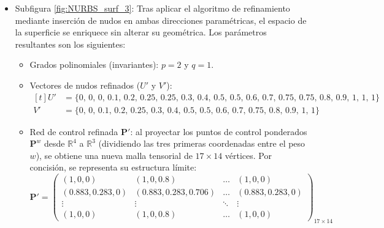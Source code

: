 \documentclass[11pt]{book}
\theoremstyle{plain} %
\theoremstyle{definition} %
\theoremstyle{definition} %
\begin{document}
\begin{itemize}
\begin{itemize}
\begin{equation*}
\begin{pmatrix}
                1 & 1 & 1 & 1 & 1 \\
                \frac{\sqrt{2}}{2} & \frac{\sqrt{2}}{2} & \frac{\sqrt{2}}{2} & \frac{\sqrt{2}}{2} & \frac{\sqrt{2}}{2} \\
                1 & 1 & 1 & 1 & 1
            \end{pmatrix}
        \end{equation*}
    \end{itemize}
    \item Subfigura \ref{fig:NURBS_surf_3}:
    Tras aplicar el algoritmo de refinamiento mediante inserción de nudos en ambas direcciones paramétricas, el espacio de la superficie se enriquece sin alterar su geométrica. Los parámetros resultantes son los siguientes:

    \begin{itemize}
        \item Grados polinomiales (invariantes): $p = 2$ y $q = 1$.
        \item Vectores de nudos refinados ($U'$ y $V'$): \\
        $\begin{aligned}[t]
            U' &= \{0,\, 0,\, 0,\, 0.1,\, 0.2,\, 0.25,\, 0.25,\, 0.3,\, 0.4,\, 0.5,\, 0.5,\, 0.6,\, 0.7,\, 0.75,\, 0.75,\, 0.8,\, 0.9,\, 1,\, 1,\, 1\} \\
            V' &= \{0,\, 0,\, 0.1,\, 0.2,\, 0.25,\, 0.3,\, 0.4,\, 0.5,\, 0.5,\, 0.6,\, 0.7,\, 0.75,\, 0.8,\, 0.9,\, 1,\, 1\}
        \end{aligned}$
        \item Red de control refinada $\mathbf{P}'$: al proyectar los puntos de control ponderados $\mathbf{P}^w$ desde $\mathbb{R}^4$ a $\mathbb{R}^3$ (dividiendo las tres primeras coordenadas entre el peso $w$), se obtiene una nueva malla tensorial de $17 \times 14$ vértices. Por concisión, se representa su estructura límite:
        \begin{equation*}
            \mathbf{P}' = \begin{pmatrix}
                (1, 0, 0) & (1, 0, 0.8) & \dots & (1, 0, 0) \\
                (0.883, 0.283, 0) & (0.883, 0.283, 0.706) & \dots & (0.883, 0.283, 0) \\
                \vdots & \vdots & \ddots & \vdots \\
                (1, 0, 0) & (1, 0, 0.8) & \dots & (1, 0, 0)
            \end{pmatrix}_{17 \times 14}
        \end{equation*}

\end{itemize}
\end{itemize}
\end{document}
